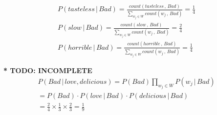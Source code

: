 \documentclass[9pt,twocolumn]{article}
\begin{document}
\begin{equation}
\begin{split}
P(tasteless\,|\,Bad) = \frac{count(tasteless\,,\,Bad)}{\sum_{w_j\in W}count(w_j\,,\,Bad)} = \frac{1}{4}\\
P(slow\,|\,Bad) = \frac{count(slow\,,\,Bad)}{\sum_{w_j\in W}count(w_j\,,\,Bad)} = \frac{2}{4}\\
P(horrible\,|\,Bad) = \frac{count(horrible\,,\,Bad)}{\sum_{w_j\in W}count(w_j\,,\,Bad)} = \frac{1}{4}
\end{split}
\end{equation}

\textbf{* TODO: INCOMPLETE}
\begin{equation}
\begin{split}
P(Bad\,|\,{love, delicious}) = P(Bad)\prod_{w_j\in W}P(w_j\,|\,Bad)\\
= P(Bad)\cdot P(love\,|\,Bad)\cdot P(delicious\,|\,Bad)\\
= \frac{2}{4}\times\frac{1}{3}\times\frac{2}{3} = \frac{1}{9}
\end{split}
\end{equation}
\end{document}
